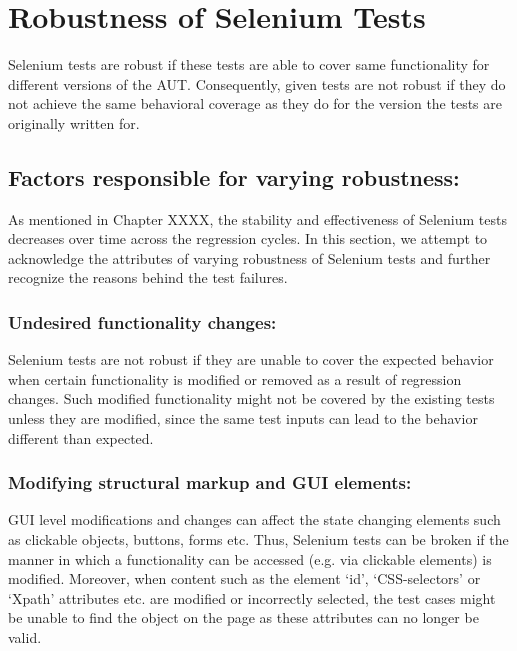 \chapter{Robustness of Selenium Tests} %

\label{Chapter4} %


Selenium tests are robust if these tests are able to cover same functionality for different versions of the AUT. Consequently, given tests are not robust if they do not achieve the same behavioral coverage as they do for the version the tests are originally written for.

\section{Factors responsible for varying robustness:}
\label{sec:RobustnessFactors}
As mentioned in Chapter XXXX, the stability and effectiveness of Selenium tests decreases over time across the regression cycles. In this section, we attempt to acknowledge the attributes of varying robustness of Selenium tests and further recognize the reasons behind the test failures. 

\subsection{Undesired functionality changes:}
\label{sec:FuncChanges}
Selenium tests are not robust if they are unable to cover the expected behavior when certain functionality is modified or removed as a result of regression changes. Such modified functionality might not be covered by the existing tests unless they are modified, since the same test inputs can lead to the behavior different than expected.

\subsection{Modifying structural markup and GUI elements:}
\label{sec:GUIChanges}
GUI level modifications and changes can affect the state changing elements such as clickable objects, buttons, forms etc. Thus, Selenium tests can be broken if the manner in which a functionality can be accessed (e.g. via clickable elements) is modified. Moreover, when content such as the element ‘id’, ‘CSS-selectors’ or ‘Xpath’ attributes etc. are modified or incorrectly selected, the test cases might be unable to find the object on the page as these attributes can no longer be valid.

